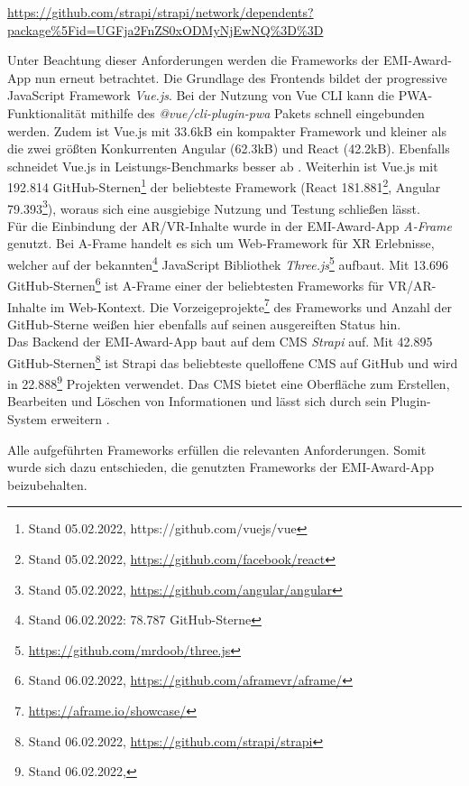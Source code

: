 \urldef\strapidep\url{https://github.com/strapi/strapi/network/dependents?package%5Fid=UGFja2FnZS0xODMyNjEwNQ%3D%3D}

Unter Beachtung dieser Anforderungen werden die Frameworks der EMI-Award-App nun
erneut betrachtet. Die Grundlage des Frontends bildet der progressive JavaScript
Framework \textit{Vue.js}. Bei der Nutzung von Vue CLI kann die
PWA-Funktionalität mithilfe des \textit{@vue/cli-plugin-pwa} Pakets schnell
eingebunden werden. Zudem ist Vue.js mit 33.6kB \cite[{v3.2.29, minifiziert und
            komprimiert}]{Kanodia2022} ein kompakter Framework und kleiner als die zwei
größten Konkurrenten Angular (62.3kB) und React (42.2kB). Ebenfalls schneidet
Vue.js in Leistungs-Benchmarks besser ab \cite{Krause2022}. Weiterhin ist Vue.js
mit 192.814 GitHub-Sternen\footnote{Stand 05.02.2022,
    https://github.com/vuejs/vue} der beliebteste Framework (React
181.881\footnote{Stand 05.02.2022, \url{https://github.com/facebook/react}},
Angular 79.393\footnote{Stand 05.02.2022,
    \url{https://github.com/angular/angular}}), woraus sich eine ausgiebige Nutzung
und Testung schließen lässt. \\
Für die Einbindung der \ac{AR}/\ac{VR}-Inhalte wurde in der EMI-Award-App
\textit{A-Frame} genutzt. Bei A-Frame handelt es sich um Web-Framework für
\ac{XR} Erlebnisse, welcher auf der bekannten\footnote{Stand 06.02.2022: 78.787
    GitHub-Sterne} JavaScript Bibliothek \textit{Three.js}\footnote{\url{https://github.com/mrdoob/three.js}} aufbaut. Mit 13.696
GitHub-Sternen\footnote{Stand 06.02.2022,
    \url{https://github.com/aframevr/aframe/}} ist A-Frame einer der beliebtesten
Frameworks für \ac{VR}/\ac{AR}-Inhalte im Web-Kontext. Die Vorzeigeprojekte\footnote{\url{https://aframe.io/showcase/}} des Frameworks und Anzahl der
GitHub-Sterne weißen hier ebenfalls auf seinen ausgereiften Status hin. \\
Das Backend der EMI-Award-App baut auf dem \ac{CMS} \textit{Strapi} auf. Mit
42.895 GitHub-Sternen\footnote{Stand 06.02.2022,
    \url{https://github.com/strapi/strapi}} ist Strapi das beliebteste quelloffene
\ac{CMS} auf GitHub und wird in 22.888\footnote{Stand 06.02.2022, \strapidep}
Projekten verwendet. Das \ac{CMS} bietet eine Oberfläche zum Erstellen,
Bearbeiten und Löschen von Informationen und lässt sich durch sein Plugin-System
erweitern \cite{Strapi2021}.

Alle aufgeführten Frameworks erfüllen die relevanten Anforderungen. Somit wurde
sich dazu entschieden, die genutzten Frameworks der EMI-Award-App beizubehalten.

